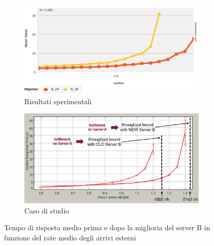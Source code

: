 \begin{figure}
    \centering
    \begin{subfigure}[b]{0.49\linewidth}
        \centering
        \includegraphics[width=\columnwidth]{figs/results/obj4/obj4-simulazione-validazione.png}
        \caption{Risultati sperimentali}
        \label{fig:obj4_validazione_simulation}
    \end{subfigure}
    \hfill
    \begin{subfigure}[b]{0.49\linewidth}
        \centering
        \includegraphics[width=\columnwidth]{figs/results/obj4/obj4-validazione.jpg}
        \caption{Caso di studio \citep{DBLP:books/sp/Serazzi24}}
        \label{fig:obj4_validazione_casestudy}
    \end{subfigure}
    \caption{Tempo di risposta medio prima e dopo la miglioria del server B in funzione del rate medio degli arrivi esterni}
    \label{fig:obj4_validazione}
\end{figure}
